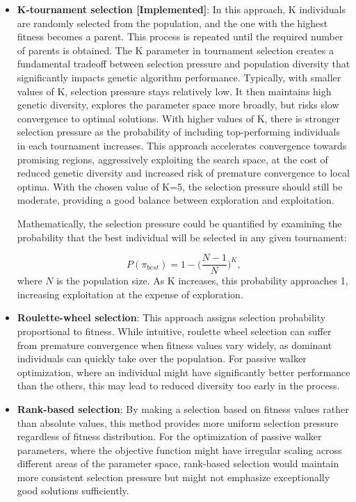 \begin{itemize}
    \item \textbf{K-tournament selection [Implemented]}: In this approach, K individuals are randomly selected from the population, and the one with the highest fitness becomes a parent.
    This process is repeated until the required number of parents is obtained.
    The K parameter in tournament selection creates a fundamental tradeoff between selection pressure and population diversity that significantly impacts genetic algorithm performance.
    Typically, with smaller values of K, selection pressure stays relatively low. It then maintains high genetic diversity, explores the parameter space more broadly, but risks slow convergence to optimal solutions.
    With higher values of K, there is stronger selection pressure as the probability of including top-performing individuals in each tournament increases.
    This approach accelerates convergence towards promising regions, aggressively exploiting the search space, at the cost of reduced genetic diversity and increased risk of premature convergence to local optima.
    With the chosen value of K=5, the selection pressure should still be moderate, providing a good balance between exploration and exploitation.

    Mathematically, the selection pressure could be quantified by examining the probability that the best individual will be selected in any given tournament:

    \begin{equation}
        P(\pi_{best}) = 1 - \Big(\frac{N - 1}{N}\Big)^K,
    \end{equation}
    where $N$ is the population size. As K increases, this probability approaches 1, increasing exploitation at the expense of exploration.

    \item \textbf{Roulette-wheel selection}: This approach assigns selection probability proportional to fitness.
    While intuitive, roulette wheel selection can suffer from premature convergence when fitness values vary widely, as dominant individuals can quickly take over the population.
    For passive walker optimization, where an individual might have significantly better performance than the others, this may lead to reduced diversity too early in the process.

    \item \textbf{Rank-based selection}: By making a selection based on fitness values rather than absolute values, this method provides more uniform selection pressure regardless of fitness distribution.
    For the optimization of passive walker parameters, where the objective function might have irregular scaling across different areas of the parameter space, rank-based selection would maintain more consistent selection pressure but might not emphasize exceptionally good solutions sufficiently.
\end{itemize}


